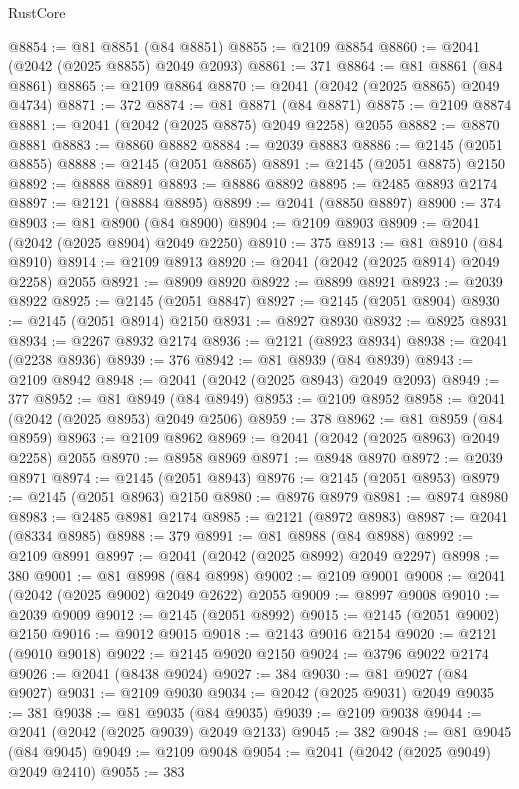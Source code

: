 \begin{lexlean}{RustCore}
\begin{coremodule}
@8854 := @81 @8851 (@84 @8851)
@8855 := @2109 @8854
@8860 := @2041 (@2042 (@2025 @8855) @2049 @2093)
@8861 := 371
@8864 := @81 @8861 (@84 @8861)
@8865 := @2109 @8864
@8870 := @2041 (@2042 (@2025 @8865) @2049 @4734)
@8871 := 372
@8874 := @81 @8871 (@84 @8871)
@8875 := @2109 @8874
@8881 := @2041 (@2042 (@2025 @8875) @2049 @2258) @2055
@8882 := @8870 @8881
@8883 := @8860 @8882
@8884 := @2039 @8883
@8886 := @2145 (@2051 @8855)
@8888 := @2145 (@2051 @8865)
@8891 := @2145 (@2051 @8875) @2150
@8892 := @8888 @8891
@8893 := @8886 @8892
@8895 := @2485 @8893 @2174
@8897 := @2121 (@8884 @8895)
@8899 := @2041 (@8850 @8897)
@8900 := 374
@8903 := @81 @8900 (@84 @8900)
@8904 := @2109 @8903
@8909 := @2041 (@2042 (@2025 @8904) @2049 @2250)
@8910 := 375
@8913 := @81 @8910 (@84 @8910)
@8914 := @2109 @8913
@8920 := @2041 (@2042 (@2025 @8914) @2049 @2258) @2055
@8921 := @8909 @8920
@8922 := @8899 @8921
@8923 := @2039 @8922
@8925 := @2145 (@2051 @8847)
@8927 := @2145 (@2051 @8904)
@8930 := @2145 (@2051 @8914) @2150
@8931 := @8927 @8930
@8932 := @8925 @8931
@8934 := @2267 @8932 @2174
@8936 := @2121 (@8923 @8934)
@8938 := @2041 (@2238 @8936)
@8939 := 376
@8942 := @81 @8939 (@84 @8939)
@8943 := @2109 @8942
@8948 := @2041 (@2042 (@2025 @8943) @2049 @2093)
@8949 := 377
@8952 := @81 @8949 (@84 @8949)
@8953 := @2109 @8952
@8958 := @2041 (@2042 (@2025 @8953) @2049 @2506)
@8959 := 378
@8962 := @81 @8959 (@84 @8959)
@8963 := @2109 @8962
@8969 := @2041 (@2042 (@2025 @8963) @2049 @2258) @2055
@8970 := @8958 @8969
@8971 := @8948 @8970
@8972 := @2039 @8971
@8974 := @2145 (@2051 @8943)
@8976 := @2145 (@2051 @8953)
@8979 := @2145 (@2051 @8963) @2150
@8980 := @8976 @8979
@8981 := @8974 @8980
@8983 := @2485 @8981 @2174
@8985 := @2121 (@8972 @8983)
@8987 := @2041 (@8334 @8985)
@8988 := 379
@8991 := @81 @8988 (@84 @8988)
@8992 := @2109 @8991
@8997 := @2041 (@2042 (@2025 @8992) @2049 @2297)
@8998 := 380
@9001 := @81 @8998 (@84 @8998)
@9002 := @2109 @9001
@9008 := @2041 (@2042 (@2025 @9002) @2049 @2622) @2055
@9009 := @8997 @9008
@9010 := @2039 @9009
@9012 := @2145 (@2051 @8992)
@9015 := @2145 (@2051 @9002) @2150
@9016 := @9012 @9015
@9018 := @2143 @9016 @2154
@9020 := @2121 (@9010 @9018)
@9022 := @2145 @9020 @2150
@9024 := @3796 @9022 @2174
@9026 := @2041 (@8438 @9024)
@9027 := 384
@9030 := @81 @9027 (@84 @9027)
@9031 := @2109 @9030
@9034 := @2042 (@2025 @9031) @2049
@9035 := 381
@9038 := @81 @9035 (@84 @9035)
@9039 := @2109 @9038
@9044 := @2041 (@2042 (@2025 @9039) @2049 @2133)
@9045 := 382
@9048 := @81 @9045 (@84 @9045)
@9049 := @2109 @9048
@9054 := @2041 (@2042 (@2025 @9049) @2049 @2410)
@9055 := 383

\end{coremodule}
\end{lexlean}
